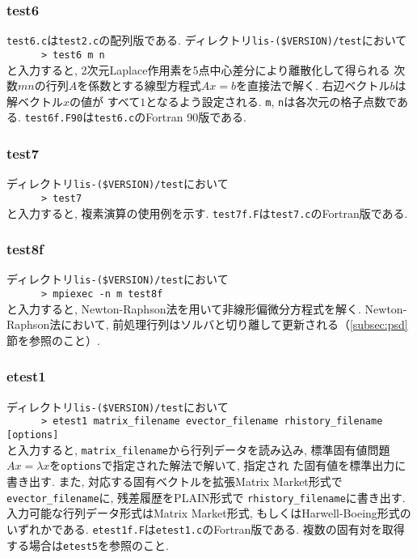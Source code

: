\documentclass[a4paper]{jarticle}
\begin{document}
{{\subsubsection{test6}
{\tt test6.c}は{\tt test2.c}の配列版である. 
ディレクトリ{\tt lis-(\$VERSION)/test}において\\
 \verb+      > test6 m n+\\
と入力すると, 2次元Laplace作用素を5点中心差分により離散化して得られる
次数$mn$の行列$A$を係数とする線型方程式$Ax=b$を直接法で解く.
右辺ベクトル$b$は解ベクトル$x$の値が
すべて$1$となるよう設定される. {\tt m}, {\tt n}は各次元の格子点数である. 
{\tt test6f.F90}は{\tt test6.c}のFortran 90版である.

\subsubsection{test7}
ディレクトリ{\tt lis-(\$VERSION)/test}において\\
 \verb+      > test7+\\
と入力すると, 複素演算の使用例を示す.
{\tt test7f.F}は{\tt test7.c}のFortran版である.

\subsubsection{test8f}

ディレクトリ{\tt lis-(\$VERSION)/test}において\\
 \verb+      > mpiexec -n m test8f+\\
 と入力すると, Newton-Raphson法を用いて非線形偏微分方程式を解く.
Newton-Raphson法において, 前処理行列はソルバと切り離して更新される（\ref{subsec:psd}節を参照のこと）.

\subsubsection{etest1}
ディレクトリ{\tt lis-(\$VERSION)/test}において\\
 \verb+      > etest1 matrix_filename evector_filename rhistory_filename [options]+\\
と入力すると, {\tt matrix\_filename}から行列データを読み込み, 
標準固有値問題$Ax=\lambda x$を{\tt options}で指定された解法で解いて, 指定され
た固有値を標準出力に書き出す. また, 対応する固有ベクトルを拡張Matrix
 Market形式で{\tt evector\_filename}に, 残差履歴をPLAIN形式で
{\tt rhistory\_filename}に書き出す. 
入力可能な行列データ形式はMatrix Market形式, もしくはHarwell-Boeing形式の
いずれかである. 
{\tt etest1f.F}は{\tt etest1.c}のFortran版である. 
複数の固有対を取得する場合は{\tt etest5}を参照のこと.

}}
\end{document}
